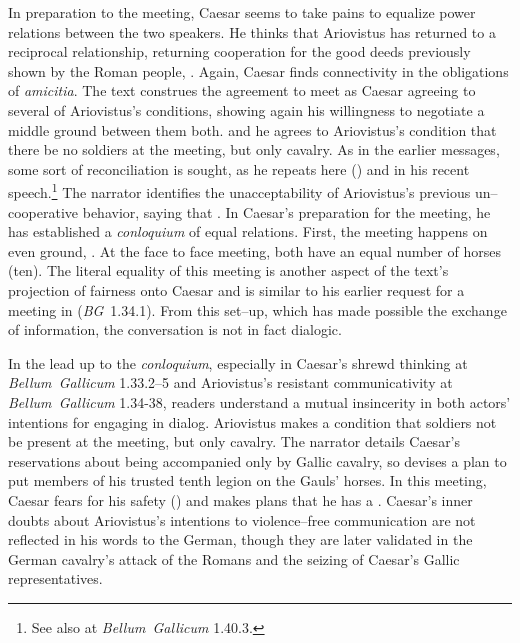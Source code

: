 \documentclass[12pt,letterpaper,oneside,final]{memoir}
\begin{document}
In preparation to the meeting, Caesar seems to take pains to equalize power relations between the two speakers. He thinks that Ariovistus has returned to a reciprocal relationship, returning cooperation for the good deeds previously shown by the Roman people, . Again, Caesar finds connectivity in the obligations of \emph{amicitia}. The text construes the agreement to meet as Caesar agreeing to several of Ariovistus's conditions, showing again his willingness to negotiate a middle ground between them both.  and he agrees to Ariovistus's condition that there be no soldiers at the meeting, but only cavalry. As in the earlier messages, some sort of reconciliation is sought, as he repeats here () and in his recent speech.\footnote{See also  at \emph{Bellum~Gallicum} 1.40.3.} The narrator identifies the unacceptability of Ariovistus's previous un--cooperative behavior, saying that . In Caesar's preparation for the meeting, he has established a \emph{conloquium} of equal relations. First, the meeting happens on even ground, . At the face to face meeting, both have an equal number of horses (ten). The literal equality of this meeting is another aspect of the text's projection of fairness onto Caesar and is similar to his earlier request for a meeting in  (\emph{BG}~1.34.1). From this set--up, which has made possible the exchange of information, the conversation is not in fact dialogic.

In the lead up to the \emph{conloquium}, especially in Caesar's shrewd thinking at \emph{Bellum~Gallicum} 1.33.2--5 and Ariovistus's resistant communicativity at \emph{Bellum~Gallicum} 1.34-38, readers understand a mutual insincerity in both actors' intentions for engaging in dialog. Ariovistus makes a condition that soldiers not be present at the meeting, but only cavalry. The narrator details Caesar's reservations about being accompanied only by Gallic cavalry, so devises a plan to put members of his trusted tenth legion on the Gauls' horses. In this meeting, Caesar fears for his safety () and makes plans that he has a  . Caesar's inner doubts about Ariovistus's intentions to violence--free communication are not reflected in his words to the German, though they are later validated in the German cavalry's attack of the Romans and the seizing of Caesar's Gallic representatives.
\end{document}
